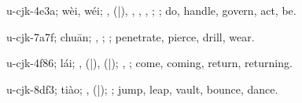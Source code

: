 \begin{multicols}{2}
{\cjkgGlue{}u-cjk-4e3a; wèi, wéi; \cjkgGlue{}, \cjkgGlue{}\cjkgGlue{}(\cjkgGlue{}|\cjkgGlue{}), \cjkgGlue{}\cjkgGlue{}\cjkgGlue{}, \cjkgGlue{}, \cjkgGlue{}\cjkgGlue{}\cjkgGlue{}, \cjkgGlue{}; \cjkgGlue{}; do, handle, govern, act, be.

\cjkgGlue{}u-cjk-7a7f; chuān; \cjkgGlue{}\cjkgGlue{}\cjkgGlue{}, \cjkgGlue{}\cjkgGlue{}\cjkgGlue{}; \cjkgGlue{}; penetrate, pierce, drill, wear.

\cjkgGlue{}u-cjk-4f86; lái; \cjkgGlue{}\cjkgGlue{}\cjkgGlue{}, \cjkgGlue{}\cjkgGlue{}(\cjkgGlue{}|\cjkgGlue{}), \cjkgGlue{}\cjkgGlue{}(\cjkgGlue{}|\cjkgGlue{}); \cjkgGlue{}, \cjkgGlue{}; come, coming, return, returning.

\cjkgGlue{}u-cjk-8df3; tiào; \cjkgGlue{}\cjkgGlue{}\cjkgGlue{}, \cjkgGlue{}\cjkgGlue{}(\cjkgGlue{}|\cjkgGlue{}); \cjkgGlue{}; jump, leap, vault, bounce, dance.

}
\end{multicols}
